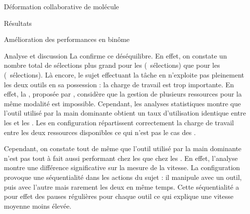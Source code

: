 \documentclass[myfrancais,ngerman,english,french]{mythesis}
\begin{document}
\begin{mychapter}{Déformation collaborative de molécule}
\begin{mysection}{Résultats}
\begin{mysubsection}{Amélioration des performances en binôme}
\begin{mysubsubsection}{Analyse et discussion}
					La  confirme ce déséquilibre.
					En effet, on constate un nombre total de sélections plus grand pour les  (~sélections) que pour les  (~sélections).
					Là encore, le sujet effectuant la tâche en  n'exploite pas pleinement les deux outils en sa possession : la charge de travail est trop importante.
					En effet, la , proposée par , considère que la gestion de plusieurs ressources pour la même modalité est impossible.
					Cependant, les analyses statistiques montre que l'outil utilisé par la main dominante obtient un taux d'utilisation identique entre les  et les .
					Les  en configuration  répartissent correctement la charge de travail entre les deux ressources disponibles ce qui n'est pas le cas des .

					Cependant, on constate tout de même que l'outil utilisé par la main dominante n'est pas tout à fait aussi performant chez les  que chez les .
					En effet, l'analyse montre une différence significative sur la mesure de la vitesse.
					La configuration  provoque une séquentialité dans les actions du sujet : il manipule avec un outil, puis avec l'autre mais rarement les deux en même temps.
					Cette séquentialité a pour effet des pauses régulières pour chaque outil ce qui explique une vitesse moyenne moins élevée.


\end{mysubsubsection}
\end{mysubsection}
\end{mysection}
\end{mychapter}
\end{document}
